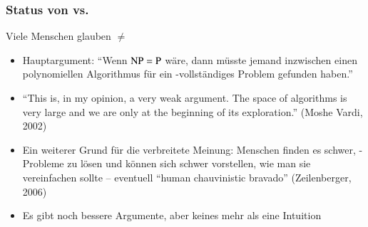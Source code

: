 \documentclass[aspectratio=1610,onlymath]{beamer}
\begin{document}
% 
%    

\begin{frame}\frametitle{Status von  vs. }

  Viele Menschen glauben  ${}\neq{}$ 
	\begin{itemize}
	\item Hauptargument: "`Wenn ${\textsc{NP}} = {\textsc{P}}$ wäre, dann müsste jemand inzwischen einen polynomiellen Algorithmus für ein -vollständiges Problem gefunden haben."'
	\item ``This is, in my opinion, a very weak argument. The space of algorithms is very large and we are only at the beginning of its exploration.'' (Moshe Vardi, 2002)
	\item Ein weiterer Grund für die verbreitete Meinung: Menschen finden es schwer, -Probleme zu lösen und können sich schwer vorstellen, wie man sie vereinfachen sollte
	-- eventuell ``human chauvinistic bravado'' (Zeilenberger, 2006)
	\item Es gibt noch bessere Argumente, aber keines mehr als eine Intuition
	\end{itemize}
\end{frame}
\end{document}
